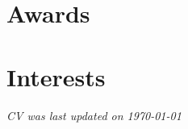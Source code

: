 \documentclass[hidelinks,letterpaper]{twentysecondcv} %
\begin{document}
\section{Awards}

\begin{twentyshort} %
\end{twentyshort}


\section{Interests}

\vfill
\flushright\textit{CV was last updated on \today}
\end{document}
